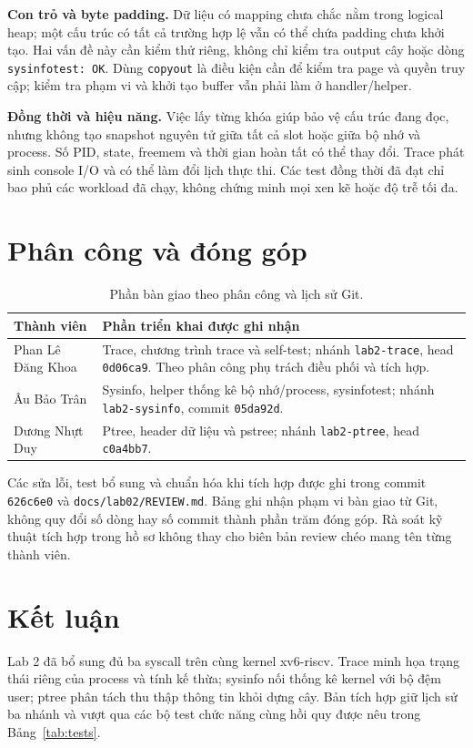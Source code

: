 \documentclass[12pt,a4paper]{article}
\newcommand{\code}[1]{\texttt{#1}}
\begin{document}
\textbf{Con trỏ và byte padding.} Dữ liệu có mapping chưa chắc nằm trong logical heap; một cấu trúc có tất cả trường hợp lệ vẫn có thể chứa padding chưa khởi tạo. Hai vấn đề này cần kiểm thử riêng, không chỉ kiểm tra output cây hoặc dòng \code{sysinfotest: OK}. Dùng \code{copyout} là điều kiện cần để kiểm tra page và quyền truy cập; kiểm tra phạm vi và khởi tạo buffer vẫn phải làm ở handler/helper.

\textbf{Đồng thời và hiệu năng.} Việc lấy từng khóa giúp bảo vệ cấu trúc đang đọc, nhưng không tạo snapshot nguyên tử giữa tất cả slot hoặc giữa bộ nhớ và process. Số PID, state, freemem và thời gian hoàn tất có thể thay đổi. Trace phát sinh console I/O và có thể làm đổi lịch thực thi. Các test đồng thời đã đạt chỉ bao phủ các workload đã chạy, không chứng minh mọi xen kẽ hoặc độ trễ tối đa.

\section{Phân công và đóng góp}\label{sec:contribution}
\begin{table}[H]
\centering\small
\caption{Phần bàn giao theo phân công và lịch sử Git.}
\label{tab:contribution}
\begin{tabularx}{\textwidth}{@{}P{3.25cm}Y@{}}
\toprule
{}\textbf{Thành viên} & \textbf{Phần triển khai được ghi nhận}\\
\midrule
Phan Lê Đăng Khoa & Trace, chương trình trace và self-test; nhánh \code{lab2-trace}, head \code{0d06ca9}. Theo phân công phụ trách điều phối và tích hợp.\\
Âu Bảo Trân & Sysinfo, helper thống kê bộ nhớ/process, sysinfotest; nhánh \code{lab2-sysinfo}, commit \code{05da92d}.\\
Dương Nhựt Duy & Ptree, header dữ liệu và pstree; nhánh \code{lab2-ptree}, head \code{c0a4bb7}.\\
\bottomrule
\end{tabularx}
\end{table}
Các sửa lỗi, test bổ sung và chuẩn hóa khi tích hợp được ghi trong commit \code{626c6e0} và \code{docs/lab02/REVIEW.md}. Bảng ghi nhận phạm vi bàn giao từ Git, không quy đổi số dòng hay số commit thành phần trăm đóng góp. Rà soát kỹ thuật tích hợp trong hồ sơ không thay cho biên bản review chéo mang tên từng thành viên.

\clearpage
\section{Kết luận}
Lab 2 đã bổ sung đủ ba syscall trên cùng kernel xv6-riscv. Trace minh họa trạng thái riêng của process và tính kế thừa; sysinfo nối thống kê kernel với bộ đệm user; ptree phân tách thu thập thông tin khỏi dựng cây. Bản tích hợp giữ lịch sử ba nhánh và vượt qua các bộ test chức năng cùng hồi quy được nêu trong Bảng~\ref{tab:tests}.
\end{document}
